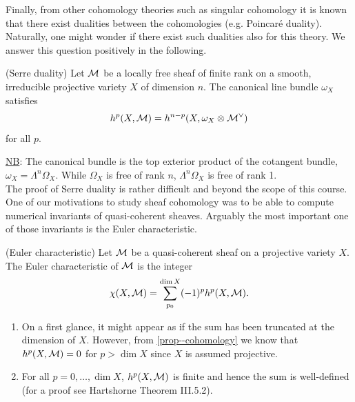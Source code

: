 \documentclass[a4paper,11pt]{article}
\begin{document}
			Finally, from other cohomology theories such as singular cohomology it is known that there exist dualities between the cohomologies (e.g. Poincar{\'e} duality). Naturally, one might wonder if there exist such dualities also for this theory. We answer this question positively in the following.
			
			\begin{thm}
				(Serre duality) Let $\mathcal{M}$ be a locally free sheaf of finite rank on a smooth, irreducible projective variety $X$ of dimension $n$. The canonical line bundle $\omega_X$ satisfies
				\begin{equation*}
					h^p(X,\mathcal{M})=h^{n-p}(X,\omega_X\otimes\mathcal{M}^\vee)
				\end{equation*}
				for all $p$.
			\end{thm}

			\noindent\underline{NB}: The canonical bundle is the top exterior product of the cotangent bundle, $\omega_X=\Lambda^n\Omega_X$. While $\Omega_X$ is free of rank $n$, $\Lambda^n\Omega_X$ is free of rank 1.
			\\

			\noindent The proof of Serre duality is rather difficult and beyond the scope of this course.
			\\

			One of our motivations to study sheaf cohomology was to be able to compute numerical invariants of quasi-coherent sheaves. Arguably the most important one of those invariants is the Euler characteristic.

			\begin{defi}
				(Euler characteristic) Let $\mathcal{M}$ be a quasi-coherent sheaf on a projective variety $X$. The Euler characteristic of $\mathcal{M}$ is the integer
				\begin{equation*}
					\chi(X,\mathcal{M})=\sum_{p_0}^{\dim X}(-1)^ph^p(X,\mathcal{M}).
				\end{equation*}
			\end{defi}

			\begin{remark}
				\begin{enumerate}
					\item On a first glance, it might appear as if the sum has been truncated at the dimension of $X$. However, from \autoref{prop--cohomology} we know that $h^p(X,\mathcal{M})=0$ for $p>\dim X$ since $X$ is assumed projective.
					\item For all $p=0,\dots,\dim X$, $h^p(X,\mathcal{M})$ is finite and hence the sum is well-defined (for a proof see Hartshorne Theorem III.5.2).
				\end{enumerate}
			\end{remark}
\end{document}
